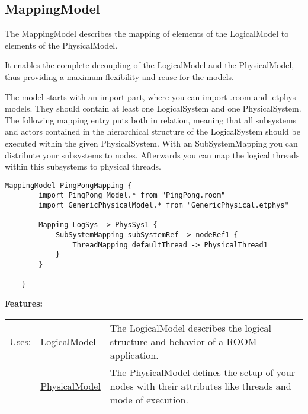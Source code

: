 \subsection{MappingModel}
	\hypertarget{ref:MappingModel}{}
	The MappingModel describes the mapping of elements of the LogicalModel to elements of the PhysicalModel.
		
	It enables the complete decoupling of the LogicalModel and the PhysicalModel, thus providing a maximum flexibility and reuse for the models.
	
	The model starts with an import part, where you can import .room and .etphys models. They should contain at least one LogicalSystem and one PhysicalSystem.
	The following mapping entry puts both in relation, meaning that all subsystems and actors contained in the hierarchical structure of the LogicalSystem should be executed within the given PhysicalSystem.
	With an SubSystemMapping you can distribute your subsystems to nodes. Afterwards you can map the logical threads within this subsystems to physical threads.
	\begin{lstlisting}[language=etMap]
	MappingModel PingPongMapping {
		import PingPong_Model.* from "PingPong.room"
		import GenericPhysicalModel.* from "GenericPhysical.etphys"
	
		Mapping LogSys -> PhysSys1 {
			SubSystemMapping subSystemRef -> nodeRef1 {
				ThreadMapping defaultThread -> PhysicalThread1
			}
		}
	
	}
	\end{lstlisting}
		
		
	\begingroup
	\textbf{Features:}
	\renewcommand{\arraystretch}{1.8} %
	\begin{longtable}{l|l p{}}
		\hline
	Uses: & \tabitem \hyperlink{ref:LogicalModel}{LogicalModel}  & The LogicalModel describes the logical structure and behavior of a ROOM application.\\
	& \tabitem \hyperlink{ref:PhysicalModel}{PhysicalModel}  & The PhysicalModel defines the setup of your nodes with their attributes like threads and mode of execution. \\
	\hline
	\end{longtable}
	\endgroup
		
		
	
	\vspace{\baselineskip}
	\vspace{\baselineskip}
	\vspace{\baselineskip}
	
